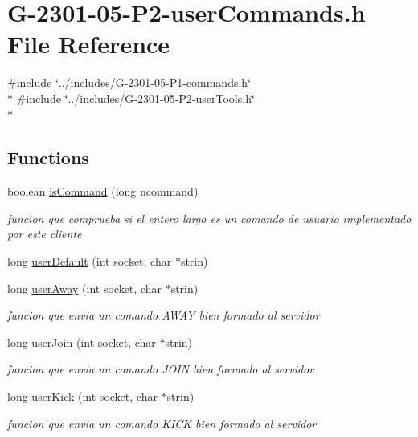 \hypertarget{_g-2301-05-_p2-user_commands_8h}{\section{G-\/2301-\/05-\/\-P2-\/user\-Commands.h File Reference}
\label{_g-2301-05-_p2-user_commands_8h}
}
{\ttfamily \#include \char`\"{}../includes/\-G-\/2301-\/05-\/\-P1-\/commands.\-h\char`\"{}}\\*
{\ttfamily \#include \char`\"{}../includes/\-G-\/2301-\/05-\/\-P2-\/user\-Tools.\-h\char`\"{}}\\*
\subsection*{Functions}
\begin{DoxyCompactItemize}
\item 
boolean \hyperlink{_g-2301-05-_p2-user_commands_8h_a8298aa0faf55aaec114edcb8d908c25e}{is\-Command} (long ncommand)
\begin{DoxyCompactList}\small\item\em funcion que comprueba si el entero largo es un comando de usuario implementado por este cliente \end{DoxyCompactList}\item 
long \hyperlink{_g-2301-05-_p2-user_commands_8h_ac0f28bc6174a23bc74895136febcc3d9}{user\-Default} (int socket, char $\ast$strin)
\item 
long \hyperlink{_g-2301-05-_p2-user_commands_8h_ad4918963d95cb113d1880341f5f6d35d}{user\-Away} (int socket, char $\ast$strin)
\begin{DoxyCompactList}\small\item\em funcion que envia un comando A\-W\-A\-Y bien formado al servidor \end{DoxyCompactList}\item 
long \hyperlink{_g-2301-05-_p2-user_commands_8h_a1c5dfac34cc7c7e9f4f4ae92d480c860}{user\-Join} (int socket, char $\ast$strin)
\begin{DoxyCompactList}\small\item\em funcion que envia un comando J\-O\-I\-N bien formado al servidor \end{DoxyCompactList}\item 
long \hyperlink{_g-2301-05-_p2-user_commands_8h_a1160187ecb124da41bd62d3987f493ec}{user\-Kick} (int socket, char $\ast$strin)
\begin{DoxyCompactList}\small\item\em funcion que envia un comando K\-I\-C\-K bien formado al servidor \end{DoxyCompactList}\item 

\end{DoxyCompactItemize}
